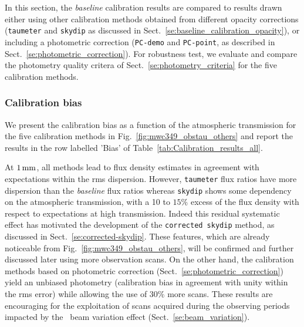 In this section, the \emph{baseline} calibration results are compared to
results drawn either using other calibration methods obtained from different
opacity corrections ({\tt taumeter} and {\tt skydip} as
discussed in Sect.~\ref{se:baseline_calibration_opacity}), or
including a photometric correction ({\tt PC-demo} and {\tt PC-point},
as described in Sect.~\ref{se:photometric_correction}). For robustness test, we
evaluate and compare the photometry quality critera of
Sect.~\ref{se:photometry_criteria} for the five calibration methods.


\subsubsection{Calibration bias}
\label{se:calibration_bias_all}

We present the calibration bias as a function of the atmospheric
transmission for the five calibration methods in
Fig.~\ref{fig:mwc349_obstau_others} and report the results in the row
labelled 'Bias' of Table~\ref{tab:Calibration_results_all}.

At $1\,\rm{mm}$, all methods lead to flux density estimates in
agreement with expectations within the rms dispersion. However,
{\tt taumeter} flux ratios have more dispersion than
the \emph{baseline} flux ratios whereas {\tt skydip} shows some
dependency on the atmospheric
transmission, with a 10 to $15\%$ excess of the flux density with
respect to expectations at high transmission. Indeed this residual
systematic effect has motivated the development of the {\tt corrected
  skydip} method, as discussed in
Sect.~\ref{se:corrected-skydip}. These features, which are
already noticeable from Fig.~\ref{fig:mwc349_obstau_others}, will be
confirmed and further discussed later using more observation scans. On
the other hand, the calibration methods based on photometric
correction (Sect.~\ref{se:photometric_correction}) yield an
unbiased photometry (calibration bias in agreement with unity
within the rms error) while allowing the use of $30\%$ more
scans. These results are encouraging for the exploitation of scans
acquired during the observing periods
impacted by the \afternoon\ beam variation effect
(Sect.~\ref{se:beam_variation}).

